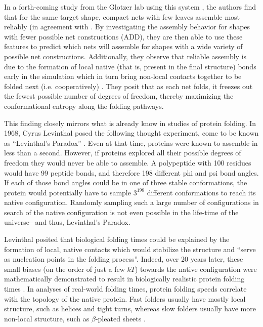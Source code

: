 In a forth-coming study from the Glotzer lab using this system \cite{Dodd_2018_unpublished}, the authors find that for the same target shape, compact nets with few leaves assemble most reliably (in agreement with \cite{Azam_2009_PlosOne}.
By investigating the assembly behavior for shapes with fewer possible net constructions (ADD), they are then able to use these features to predict which nets will assemble for shapes with a wide variety of possible net constructions. 
Additionally, they observe that reliable assembly is due to the formation of local native (that is, present in the final structure) bonds early in the simulation which in turn bring non-local contacts together to be folded next (i.e. cooperatively) \cite{Dill_1993_PNAS}.
They posit that as each net folds, it freezes out the fewest possible number of degrees of freedom, thereby maximizing the conformational entropy along the folding pathways.

This finding closely mirrors what is already know in studies of protein folding.
In 1968, Cyrus Levinthal posed the following thought experiment, come to be known as ``Levinthal's Paradox'' \cite{Levinthal_1969}.
Even at that time, proteins were known to assemble in less than a second.
However, if proteins explored all their possible degrees of freedom they would never be able to assemble.
A polypeptide with 100 residues would have 99 peptide bonds, and therefore 198 different phi and psi bond angles.
If each of those bond angles could be in one of three stable conformations, the protein would potentially have to sample $3^{198}$ different conformations to reach its native configuration.
Randomly sampling such a large number of configurations in search of the native configuration is not even possible in the life-time of the universe-- and thus, Levinthal's Paradox.

Levinthal posited that biological folding times could be explained by the formation of local, native contacts which would stabilize the structure and ``serve as nucleation points in the folding process''.
Indeed, over 20 years later, these small biases (on the order of just a few $kT$) towards the native configuration were mathematically demonstrated to result in biologically realistic protein folding times \cite{Zwanzig_1992_PNAS,Martinez_2014_JChemEd}.
In analyses of real-world folding times, protein folding speeds correlate with the topology of the native protein.
Fast folders usually have mostly local structure, such as helices and tight turns, whereas slow folders usually have more non-local structure, such as $\beta$-pleated sheets \cite{Plaxco_1998_JMolBio}.

